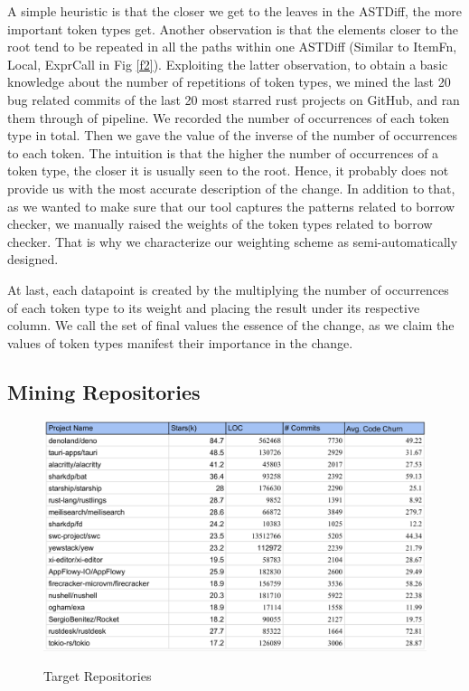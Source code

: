 A simple heuristic is that the closer we get to the leaves in the ASTDiff, the more important token types get. Another observation is that the elements closer to the root tend to be repeated in all the paths within one ASTDiff (Similar to ItemFn, Local, ExprCall in Fig \ref{f2}). Exploiting the latter observation, to obtain a basic knowledge about the number of repetitions of token types, we mined the last 20 bug related commits of the last 20 most starred rust projects on GitHub, and ran them through of pipeline. We recorded the number of occurrences of each token type in total. Then we gave the value of the inverse of the number of occurrences to each token. The intuition is that the higher the number of occurrences of a token type, the closer it is usually seen to the root. Hence, it probably does not provide us with the most accurate description of the change. In addition to that, as we wanted to make sure that our tool captures the patterns related to borrow checker, we manually raised the weights of the token types related to borrow checker. That is why we characterize our weighting scheme as semi-automatically designed. 

At last, each datapoint is created by the multiplying the number of occurrences of each token type to its weight and placing the result under its respective column. We call the set of final values the essence of the change, as we claim the values of token types manifest their importance in the change.

\subsection{Mining Repositories}

\begin{figure}[h]
\centering
\includegraphics[width=1\textwidth]{repos.png}
\label{f3}
\caption{Target Repositories}
\end{figure}

